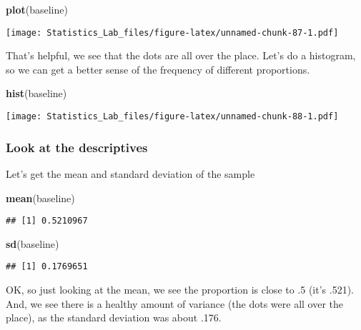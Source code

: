 \documentclass[
]{book}
\newenvironment{Shaded}{\begin{snugshade}}{\end{snugshade}}
\newcommand{\FunctionTok}[1]{\textcolor[rgb]{0.13,0.29,0.53}{\textbf{#1}}}
\newcommand{\NormalTok}[1]{#1}
\begin{document}
\begin{Shaded}
\begin{Highlighting}[]
\FunctionTok{plot}\NormalTok{(baseline)}
\end{Highlighting}
\end{Shaded}

\texttt{[image: Statistics\_Lab\_files/figure-latex/unnamed-chunk-87-1.pdf]}

That's helpful, we see that the dots are all over the place. Let's do a histogram, so we can get a better sense of the frequency of different proportions.

\begin{Shaded}
\begin{Highlighting}[]
\FunctionTok{hist}\NormalTok{(baseline)}
\end{Highlighting}
\end{Shaded}

\texttt{[image: Statistics\_Lab\_files/figure-latex/unnamed-chunk-88-1.pdf]}

\hypertarget{look-at-the-descriptives}{%
\subsubsection{Look at the descriptives}\label{look-at-the-descriptives}}

Let's get the mean and standard deviation of the sample

\begin{Shaded}
\begin{Highlighting}[]
\FunctionTok{mean}\NormalTok{(baseline)}
\end{Highlighting}
\end{Shaded}

\begin{verbatim}
## [1] 0.5210967
\end{verbatim}

\begin{Shaded}
\begin{Highlighting}[]
\FunctionTok{sd}\NormalTok{(baseline)}
\end{Highlighting}
\end{Shaded}

\begin{verbatim}
## [1] 0.1769651
\end{verbatim}

OK, so just looking at the mean, we see the proportion is close to .5 (it's .521). And, we see there is a healthy amount of variance (the dots were all over the place), as the standard deviation was about .176.
\end{document}
